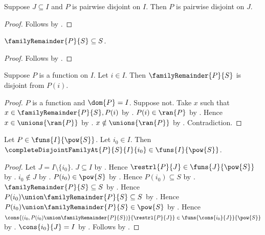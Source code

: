 \begin{proposition}\label{pairwise_disjoint_on_subdomain}
    Suppose $J\subseteq I$ and $P$ is pairwise disjoint on $I$.
    Then $P$ is pairwise disjoint on $J$.
\end{proposition}
\begin{proof}
    Follows by .
\end{proof}

\begin{proposition}\label{family_remainder_subseteq}
    $\familyRemainder{P}{S}\subseteq S$.
\end{proposition}
\begin{proof}
    Follows by .
\end{proof}

\begin{proposition}\label{family_remainder_disjoint_member}
    Suppose $P$ is a function on $I$.
    Let $i\in I$.
    Then $\familyRemainder{P}{S}$ is disjoint from $P(i)$.
\end{proposition}
\begin{proof}
    $P$ is a function and $\dom{P}=I$.
    Suppose not.
    Take $x$ such that $x\in\familyRemainder{P}{S},P(i)$
        by .
    $P(i)\in\ran{P}$ by .
    Hence $x\in\unions{\ran{P}}$ by .
    $x\notin\unions{\ran{P}}$ by .
    Contradiction.
\end{proof}

\begin{proposition}\label{complete_disjoint_family_at_type}
    Let $P\in\funs{I}{\pow{S}}$.
    Let $i_0\in I$.
    Then $\completeDisjointFamilyAt{P}{S}{I}{i_0}
        \in\funs{I}{\pow{S}}$.
\end{proposition}
\begin{proof}
    Let $J=I\setminus\{i_0\}$.
    $J\subseteq I$ by .
    Hence $\restrl{P}{J}\in\funs{J}{\pow{S}}$
        by .
    $i_0\notin J$ by .
    $P(i_0)\in\pow{S}$ by .
    Hence $P(i_0)\subseteq S$ by .
    $\familyRemainder{P}{S}\subseteq S$
        by .
    Hence $P(i_0)\union\familyRemainder{P}{S}\subseteq S$
        by .
    Hence $P(i_0)\union\familyRemainder{P}{S}\in\pow{S}$
        by .
    Hence
        $\cons{(i_0,P(i_0)\union\familyRemainder{P}{S})}
            {\restrl{P}{J}}
        \in\funs{\cons{i_0}{J}}{\pow{S}}$
        by .
    $\cons{i_0}{J}=I$ by .
    Follows by .
\end{proof}

